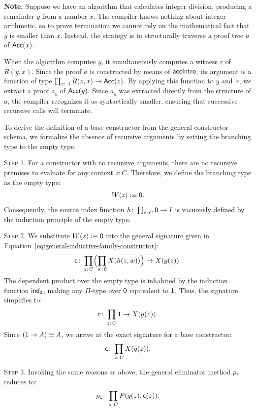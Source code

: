 \textbf{Note.} Suppose we have an algorithm that calculates integer division, producing a remainder $y$ from a number $x$. The compiler knows nothing about integer arithmetic, so to prove termination we cannot rely on the mathematical fact that $y$ is smaller than $x$. Instead, the strategy is to structurally traverse a proof tree $a$ of $\mathsf{Acc}(x)$.

When the algorithm computes $y$, it simultaneously computes a witness $r$ of $R(y,x)$. Since the proof $a$ is constructed by means of $\mathsf{accIntro}$, its argument is a function of type $\prod_{z\colon A}R(z,x)\to\fun{Acc}(z)$. By applying this function to $y$ and~$r$, we extract a proof $a_y$ of $\mathsf{Acc}(y)$. Since $a_y$ was extracted directly from the structure of $a$, the compiler recognizes it as syntactically smaller, ensuring that successive recursive calls will terminate.

\begin{rem}
    To derive the definition of a base constructor from the general constructor schema, we formalize the absence of recursive arguments by setting the branching type to the empty type.

    \textsc{Step 1.}
    For a constructor with no recursive arguments, there are no recursive premises to evaluate for any context $z\colon C$. Therefore, we define the branching type as the empty type:
    \[
        W(z)\mathrel{\vcentcolon}\equiv\mathsf{0}.
    \]
    Consequently, the source index function $h\colon\prod_{z\colon C}\fun0\to I$ is vacuously defined by the induction principle of the empty type.
    
    \textsc{Step 2.}
    We substitute $W(z)\mathrel{\vcentcolon}\equiv\mathsf{0}$ into the general signature given in Equation~\eqref{eq:general-inductive-family-constructor}:
    \[
        \fun c\colon\prod_{z\colon C}
            \Bigl(
                \prod_{w\colon\fun0}X(h(z,w))
            \Bigr)
            \to X(g(z)).
    \]
    The dependent product over the empty type is inhabited by the induction function $\mathsf{ind}_{\mathsf{0}}$, making any $\Pi$-type over $\mathsf{0}$ equivalent to $\mathsf{1}$. Thus, the signature simplifies to:
    \[
        \fun c\colon\prod_{z\colon C}\fun1\to X(g(z)).
    \]
    Since $(\mathsf{1}\to A)\simeq A$, we arrive at the exact signature for a base constructor:
    \[
        \fun c\colon\prod_{z\colon C} X(g(z)).
    \]
    
    \textsc{Step 3.}
    Invoking the same reasons as above, the general eliminator method $p_{\mathsf{c}}$ reduces to:
    \[
        p_{\fun c}\colon\prod_{z\colon C}
            P(g(z),\fun c(z)).
    \]
\end{rem}

